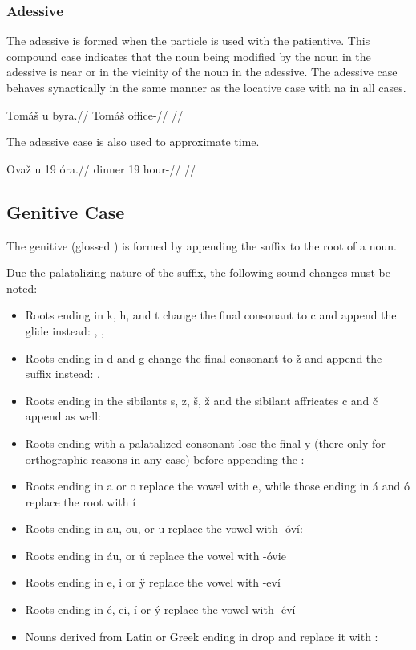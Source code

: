 \subsubsection{Adessive}
The adessive is formed when the particle  is used with the patientive. This compound case indicates that the noun being modified by the noun in the adessive is near or in the vicinity of the noun in the adessive. The adessive case behaves synactically in the same manner as the locative case with na in all cases.

\pex
\begingl
\gla Tomáš u byra.//
\glb Tomáš  office-//
\glft {}//
\endgl
\xe

The adessive case is also used to approximate time.

\pex
\begingl
\gla Ovaž u 19 \'ora.//
\glb dinner  19 hour-//
\glft {}//
\endgl
\xe

\subsection{Genitive Case}

The genitive (glossed ) is formed by appending the suffix  to the root of a noun.

Due the palatalizing nature of the suffix, the following sound changes must be noted:

\begin{itemize}
	\item Roots ending in k, h, and t change the final consonant to c and append the glide  instead:  ,  ,  
	\item Roots ending in d and g change the final consonant to ž and append the suffix  instead:  ,  
	\item Roots ending in the sibilants s, z, š, ž and the sibilant affricates c and č append  as well:
	\item Roots ending with a palatalized consonant lose the final y (there only for orthographic reasons in any case) before appending the : 
	\item Roots ending in a or o replace the vowel with e, while those ending in á and \'o replace the root with í
	\item Roots ending in au, ou, or u replace the vowel with -\'oví:  
	\item Roots ending in áu, or ú replace the vowel with -\'ovie
	\item Roots ending in e, i or \"y replace the vowel with -eví
	\item Roots ending in é, ei, í or \'y replace the vowel with -éví
  \item Nouns derived from Latin or Greek ending in  drop  and replace it with : 
\end{itemize}


